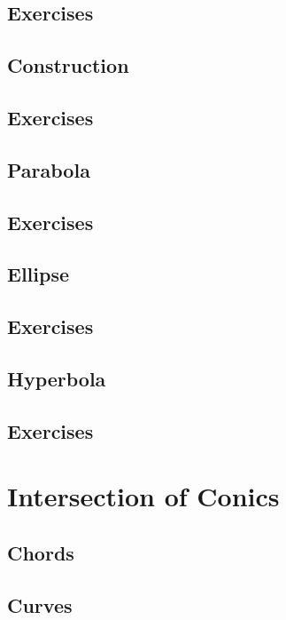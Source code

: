 \documentclass[11pt]{book}
\begin{document}
\section{Exercises}

\section{Construction}

\section{Exercises}

\section{Parabola}

\section{Exercises}

\section{Ellipse}

\section{Exercises}

\section{Hyperbola}

\section{Exercises}


\chapter{Intersection of Conics}
\section{Chords }

\section{Curves}

%
\end{document}
